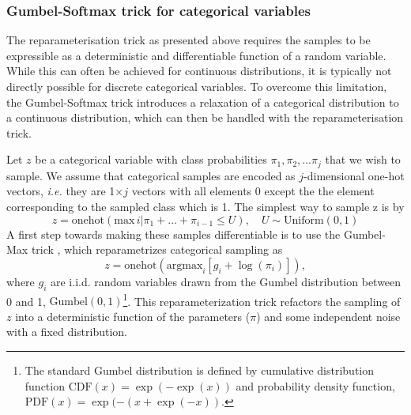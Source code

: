 \documentclass[a4paper,usenatbib]{mnras}
\begin{document}
\subsubsection{Gumbel-Softmax trick for categorical variables}

The reparameterisation trick as presented above requires the samples to be expressible as a deterministic and differentiable function of a random variable. While this can often be achieved for continuous distributions, it is typically not directly possible for discrete categorical variables. 
To overcome this limitation, the Gumbel-Softmax trick \citep{2016arXiv161101144J,2016arXiv161100712M} introduces a relaxation of a categorical distribution to a continuous distribution, which can then be handled with the reparameterisation trick.

Let $z$ be a categorical variable with class probabilities $\pi_1,\pi_2,...\pi_j$ that we wish to sample.
We assume that categorical samples are encoded as $j$-dimensional one-hot vectors, 
\emph{i.e.} they are 1$\times j$ vectors with all elements 0 except the
the element corresponding  to the sampled class which is 1. 
The simplest way to sample z is by 
\begin{equation}
    z = \textrm{onehot}(\textrm{max}{\, i | \pi_1 + ... + \pi_{i-1}\leq U}), \quad U \sim \textrm{Uniform}(0, 1)
    \label{eq:naivesampling}
\end{equation} 
A first step towards making these samples differentiable is to use the Gumbel-Max trick \citep{gumbel1954statistical,2014arXiv1411.0030M}, which reparametrizes categorical sampling as 
\begin{equation}
    z = \textrm{onehot}\left(\textrm{argmax}_{i}[g_i + \log{(\pi_i)}]\right),
    \label{eq:reparametrize}
\end{equation}
where $g_i$ are i.i.d. random variables drawn from the Gumbel distribution between 0 and 1, $\textrm{Gumbel}(0, 1)$\footnote{The standard Gumbel distribution is defined by cumulative distribution function $\textrm{CDF}(x) = \exp(-\exp(x))$ and probability density function, $\textrm{PDF}(x) = \exp(-(x+\exp(-x))$.}. 
This reparameterization trick refactors the sampling of $z$ into a deterministic function of the parameters ($\pi$) and some independent noise with a fixed distribution.
\end{document}
